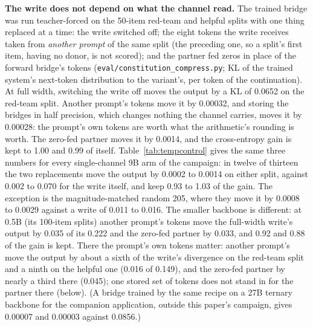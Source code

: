 \documentclass[11pt]{article}
\newcommand{\code}[1]{\texttt{#1}}
\begin{document}
\textbf{The write does not depend on what the channel read.} The trained bridge was
run teacher-forced on the 50-item red-team and helpful splits with one thing
replaced at a time: the write switched off; the eight tokens the write receives
taken from \emph{another prompt} of the same split (the preceding one, so a split's
first item, having no donor, is not scored); and the partner fed zeros in
place of the forward bridge's tokens (\code{eval/\allowbreak{}constitution\_compress.py};
KL of the trained system's next-token distribution to the variant's, per token of
the continuation). At full width, switching the write off moves the output by a KL
of 0.0652 on the red-team split. Another prompt's tokens move it by 0.00032, and
storing the bridges in half precision, which changes nothing the channel carries,
moves it by 0.00028: the prompt's own tokens are worth what the arithmetic's
rounding is worth. The zero-fed partner moves it by 0.0014, and the cross-entropy
gain is kept to 1.00 and 0.99 of itself. Table~\ref{tab:tempcontrol} gives the same
three numbers for every single-channel 9B arm of the campaign: in twelve of thirteen the two replacements move the
output by 0.0002 to 0.0014 on either split, against 0.002 to 0.070 for the write
itself, and keep 0.93 to 1.03 of the gain. The exception is the magnitude-matched
random 205, where they move it by 0.0008 to 0.0029 against a write of 0.011 to
0.016. The smaller backbone is different: at 0.5B (its 100-item splits) another
prompt's tokens move the full-width write's output by 0.035 of its 0.222 and the
zero-fed partner by 0.033, and 0.92 and 0.88 of the gain is kept. There the prompt's
own tokens matter: another prompt's move the output by about a sixth of the write's
divergence on the red-team split and a ninth on the helpful one (0.016 of 0.149),
and the zero-fed partner by nearly a third there (0.045); one stored set of
tokens does not stand in for the partner there (below). (A bridge trained by the same recipe on a 27B ternary
backbone for the companion application, outside this paper's campaign, gives
0.00007 and 0.00003 against 0.0856.)
\end{document}
